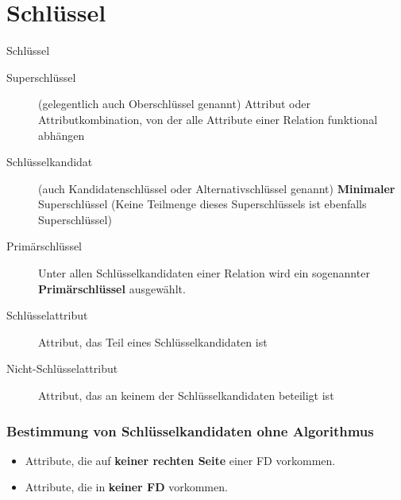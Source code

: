 \documentclass{lehramt-informatik-haupt}
\begin{document}
\let\ah=\liAttributHuelle
\let\m=\liAttributMenge

%

\chapter{Schlüssel}

\begin{lernkartei}{Schlüssel}
\begin{description}
\item[Superschlüssel] (gelegentlich auch Oberschlüssel genannt) Attribut
oder Attributkombination, von der alle Attribute einer Relation
funktional abhängen

\item[Schlüsselkandidat] (auch Kandidatenschlüssel oder
Alternativschlüssel genannt) \textbf{Minimaler} Superschlüssel (Keine
Teilmenge dieses Superschlüssels ist ebenfalls Superschlüssel)

\item[Primärschlüssel] Unter allen Schlüsselkandidaten einer
Relation wird ein sogenannter \textbf{Primärschlüssel} ausgewählt.

\item[Schlüsselattribut] Attribut, das Teil eines
Schlüsselkandidaten ist

\item[Nicht-Schlüsselattribut] Attribut, das an keinem der
Schlüsselkandidaten beteiligt ist
\end{description}
\end{lernkartei}

%

\subsection{Bestimmung von Schlüsselkandidaten ohne Algorithmus}

\begin{itemize}
\item Attribute, die auf \textbf{keiner rechten Seite} einer FD
vorkommen.

\item Attribute, die in \textbf{keiner FD} vorkommen.
\end{itemize}
\end{document}
